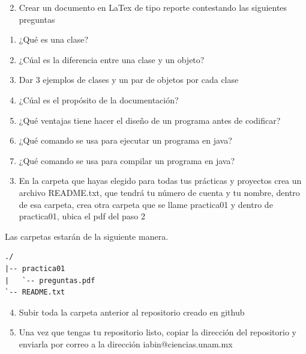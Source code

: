 \documentclass{article}
\providecommand{\tightlist}{}
\begin{document}
{}

{}

{}

{}

{}

\begin{enumerate}
\setcounter{enumi}{1}
\tightlist
\item
  {Crear un documento en LaTex de tipo reporte contestando las siguientes preguntas}
\end{enumerate}

\begin{enumerate}
\tightlist
\item
  {¿Qué es una clase?}
\item
  {¿Cúal es la diferencia entre una clase y un objeto?}
\item
  {Dar 3 ejemplos de clases y un par de objetos por cada clase}
\item
  {¿Cúal es el propósito de la documentación?}
\item
  {¿Qué ventajas tiene hacer el diseño de un programa antes de codificar?}
\item
  {¿Qué comando se usa para ejecutar un programa en java?}
\item
  {¿Qué comando se usa para compilar un programa en java?}
\end{enumerate}

{}

\begin{enumerate}
\setcounter{enumi}{2}
\tightlist
\item
  {En la carpeta que hayas elegido para todas tus prácticas y proyectos crea un archivo README.txt, que tendrá tu número de cuenta y tu nombre, dentro de esa carpeta, crea otra carpeta que se llame practica01 y dentro de practica01, ubica el pdf del paso 2}
\end{enumerate}

{}

{}

{Las carpetas estarán de la siguiente manera.}

\begin{verbatim}
./
|-- practica01
|   `-- preguntas.pdf
`-- README.txt
\end{verbatim}

{}

\begin{enumerate}
\setcounter{enumi}{3}
\tightlist
\item
  {Subir toda la carpeta anterior al repositorio creado en github}
\item
  {U}{na vez que tengas tu repositorio listo, copiar la dirección del repositorio y enviarla por correo a la dirección iabin@ciencias.unam.mx}
\end{enumerate}
\end{document}
